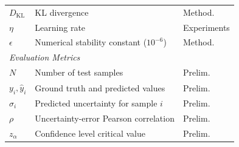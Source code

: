 \begin{table}[!ht]
\begin{tabular}{lll}
$D_{\text{KL}}$ & KL divergence & Method. \\
$\eta$ & Learning rate & Experiments \\
$\epsilon$ & Numerical stability constant ($10^{-6}$) & Method. \\
\midrule
\multicolumn{3}{l}{\textit{Evaluation Metrics}} \\
$N$ & Number of test samples & Prelim. \\
$y_i, \hat{y}_i$ & Ground truth and predicted values & Prelim. \\
$\hat{\sigma}_i$ & Predicted uncertainty for sample $i$ & Prelim. \\
$\rho$ & Uncertainty-error Pearson correlation & Prelim. \\
$z_\alpha$ & Confidence level critical value & Prelim. \\
\bottomrule
\end{tabular}
\end{table}